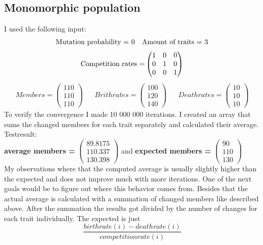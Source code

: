 \documentclass{article}
\newcommand{\vect}[3]{\ensuremath{\begin{pmatrix}	#1 \\ #2 \\ #3	\end{pmatrix}}}
\begin{document}
\subsection{Monomorphic population}
I used the following input:
\begin{align*}
\textnormal{Mutation probability = 0}
&&\textnormal{Amount of traits = 3}
\end{align*}
\[\textnormal{Competition rates =} 
\begin{pmatrix}	1 & 0 & 0 \\ 0 & 1 & 0  \\ 0 & 0 & 1 \end{pmatrix}\]
\begin{align*}
	Members = \begin{pmatrix}	110 \\ 110 \\ 110	\end{pmatrix} && Brithrates = \begin{pmatrix}	100 \\ 120 \\ 140	\end{pmatrix} && Deathrates = \begin{pmatrix}	10 \\ 10 \\ 10	\end{pmatrix}
\end{align*}
To verify the convergence I made 10 000 000 iterations. I created an array that sums the changed members for each trait separately and calculated their average.\\
Testresult:\\
\textbf{average members = } \vect{89.8175}{110.337}{130.398} and \textbf{expected members = } \vect{90}{110}{130}\\
My observations where that the computed average is usually slightly higher than the expected and does not improve much with more iterations. One of the next goals would be to figure out where this behavior comes from. Besides that the actual average is calculated with a summation of changed members like described above. After the summation the results got divided by the number of changes for each trait individually. The expected is just
\[\frac{birthrate(i) - deathrate(i)}{competitionrate(i)}\] 

\newpage
\end{document}
